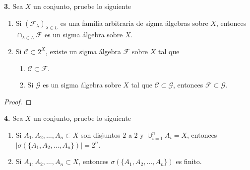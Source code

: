 \documentclass{article}
\newenvironment{statement}[1]{\smallskip\noindent\color[rgb]{1.00,0.00,0.50} {\bf #1.}}{}
\theoremstyle{definition}
\theoremstyle{remark}
\begin{document}
\begin{statement}{3}
  Sea $X$ un conjunto, pruebe lo siguiente
  \begin{enumerate}
    \item Si $(\mathcal{F}_{\lambda})_{\lambda \in L}$ es una familia arbitraria de sigma \'algebras sobre $X$, entonces $\cap_{\lambda \in L} \mathcal{F}$ es un sigma \'algebra sobre $X$.
    \item Si $\mathcal{C} \subset 2^X$, existe un sigma \'algebra $\mathcal{F}$ sobre $X$ tal que
      \begin{enumerate}
        \item $\mathcal{C} \subset \mathcal{F}$.
        \item Si $\mathcal{G}$ es un sigma \'algebra sobre $X$ tal que $\mathcal{C} \subset \mathcal{G}$, entonces $\mathcal{F} \subset \mathcal{G}$.
      \end{enumerate}
  \end{enumerate}
\end{statement}

\begin{proof}
\end{proof}

\begin{statement}{4}
  Sea $X$ un conjunto, pruebe lo siguiente
  \begin{enumerate}
    \item Si $A_1, A_2, \dots, A_n \subset X$ son disjuntos $2$ a $2$ y $\cup_{i = 1}^n A_i = X$, entonces $|\sigma(\{A_1, A_2, \dots, A_n\})| = 2^n$.
    \item Si $A_1, A_2, \dots, A_n \subset X$, entonces $\sigma(\{A_1, A_2, \dots, A_n\})$ es finito.
  \end{enumerate}
\end{statement}
\end{document}
